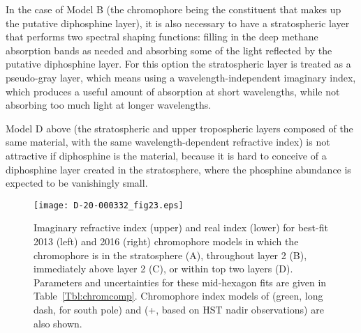 \documentclass[article,11pt]{emulateapj}
\begin{document}
In the case of Model B  (the chromophore being the constituent
that makes up the putative diphosphine layer), it is also necessary to have
a stratospheric layer that performs two spectral shaping functions: filling
in the deep methane absorption bands as needed and absorbing some
of the light reflected by the putative diphosphine layer.  For this option
the stratospheric layer is treated as a pseudo-gray layer, which
means using a wavelength-independent imaginary index, which produces a useful
amount of absorption at short wavelengths, while not absorbing too much
light at longer wavelengths.  

Model D above (the stratospheric
and upper tropospheric layers composed of the
same material, with the same wavelength-dependent refractive index) is
not attractive if diphosphine is the material, because it is hard to conceive of a diphosphine
layer created in the stratosphere, where the phosphine abundance is expected to be vanishingly small.


\begin{figure*}[!ht]\centering
\texttt{[image: D-20-000332\_fig23.eps]}
\caption{Imaginary refractive index (upper) and real index (lower) for
  best-fit 2013 (left) and 2016 (right) chromophore models in which
  the chromophore is in the stratosphere (A), throughout layer 2
  (B), immediately above layer 2 (C), or within top two layers (D).
 Parameters and uncertainties for these mid-hexagon fits
  are given in Table\ \ref{Tbl:chromcomp}. Chromophore index models of
  \cite{Kark2005} (green, long dash, for south pole) and
  \cite{Sanchez-Lavega2020hazes} (+, based on HST nadir observations)
  are also shown.}\label{Fig:imagchrom}
\end{figure*}
\end{document}
